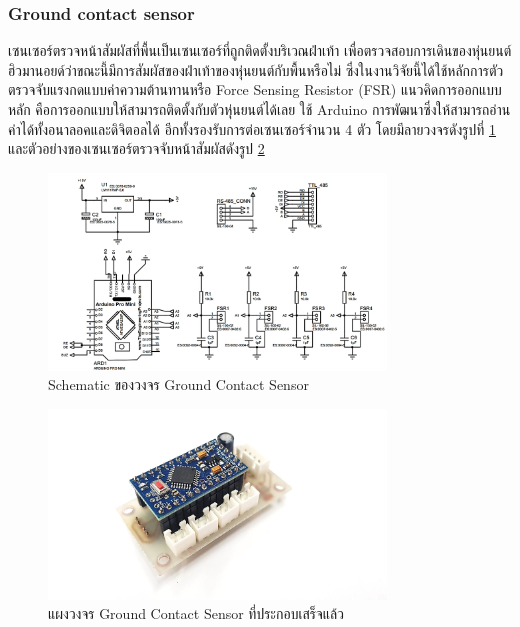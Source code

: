 \subsubsection*{Ground contact sensor}
เซนเซอร์ตรวจหน้าสัมผัสที่พื้นเป็นเซนเซอร์ที่ถูกติดตั้งบริเวณฝ่าเท้า เพื่อตรวจสอบการเดินของหุ่นยนต์ฮิวมานอยด์ว่าขณะนี้มีการสัมผัสของฝ่าเท้าของหุ่นยนต์กับพื้นหรือไม่ 
ซึ่งในงานวิจัยนี้ได้ใช้หลักการตัวตรวจจับแรงกดแบบค่าความต้านทานหรือ Force Sensing Resistor (FSR)
แนวคิดการออกแบบหลัก คือการออกแบบให้สามารถติดตั้งกับตัวหุ่นยนต์ได้เลย
ใช้ Arduino การพัฒนาซึ่งให้สามารถอ่านค่าได้ทั้งอนาลอคและดิจิตอลได้ อีกทั้งรองรับการต่อเซนเซอร์จำนวน 4 ตัว โดยมีลายวงจรดังรูปที่ \ref{fig:FSR_schematic}
และตัวอย่างของเซนเซอร์ตรวจจับหน้าสัมผัสดังรูป \ref{fig:complete_FSR}
\begin{figure}[!ht]
  \centering
  \includegraphics[width=0.8\textwidth]{chapter3/images/FSR_schematic.png}
  \caption{Schematic ของวงจร Ground Contact Sensor}
  \label{fig:FSR_schematic}
\end{figure}

\begin{figure}[!ht]
  \centering
  \includegraphics[width=0.8\textwidth]{chapter3/images/complete_FSR.png}
  \caption{แผงวงจร Ground Contact Sensor ที่ประกอบเสร็จแล้ว}
  \label{fig:complete_FSR}
\end{figure}

